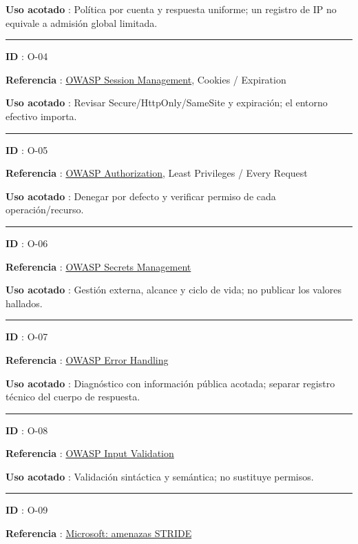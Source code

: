 \documentclass[12pt,a4paper]{report}
\begin{document}
\textbf{Uso acotado }: Política por cuenta y respuesta uniforme; un
registro de IP no equivale a admisión global limitada.

\medskip\hrule\medskip

\textbf{ID }: O-04

\textbf{Referencia
}: \href{https://cheatsheetseries.owasp.org/cheatsheets/Session_Management_Cheat_Sheet.html}{OWASP
Session Management}, Cookies / Expiration

\textbf{Uso acotado }: Revisar Secure/HttpOnly/SameSite y expiración; el
entorno efectivo importa.

\medskip\hrule\medskip

\textbf{ID }: O-05

\textbf{Referencia
}: \href{https://cheatsheetseries.owasp.org/cheatsheets/Authorization_Cheat_Sheet.html}{OWASP
Authorization}, Least Privileges / Every Request

\textbf{Uso acotado }: Denegar por defecto y verificar permiso de cada
operación/recurso.

\medskip\hrule\medskip

\textbf{ID }: O-06

\textbf{Referencia
}: \href{https://cheatsheetseries.owasp.org/cheatsheets/Secrets_Management_Cheat_Sheet.html}{OWASP
Secrets Management}

\textbf{Uso acotado }: Gestión externa, alcance y ciclo de vida; no
publicar los valores hallados.

\medskip\hrule\medskip

\textbf{ID }: O-07

\textbf{Referencia
}: \href{https://cheatsheetseries.owasp.org/cheatsheets/Error_Handling_Cheat_Sheet.html}{OWASP
Error Handling}

\textbf{Uso acotado }: Diagnóstico con información pública acotada;
separar registro técnico del cuerpo de respuesta.

\medskip\hrule\medskip

\textbf{ID }: O-08

\textbf{Referencia
}: \href{https://cheatsheetseries.owasp.org/cheatsheets/Input_Validation_Cheat_Sheet.html}{OWASP
Input Validation}

\textbf{Uso acotado }: Validación sintáctica y semántica; no sustituye
permisos.

\medskip\hrule\medskip

\textbf{ID }: O-09

\textbf{Referencia
}: \href{https://learn.microsoft.com/en-us/azure/security/develop/threat-modeling-tool-threats}{Microsoft:
amenazas STRIDE}
\end{document}
